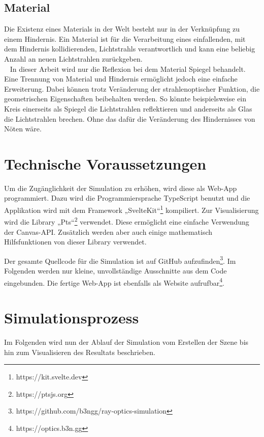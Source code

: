 \section{Material}
\label{material}
Die Existenz eines Materials  in der Welt besteht nur in der Verknüpfung zu einem Hindernis. 
Ein Material ist für die Verarbeitung eines einfallenden, mit dem Hindernis kollidierenden, Lichtstrahls verantwortlich 
und kann eine beliebig Anzahl an neuen Lichtstrahlen zurückgeben. \\ 
In dieser Arbeit wird nur die Reflexion bei dem Material Spiegel  behandelt. 
Eine Trennung von Material und Hindernis ermöglicht jedoch eine einfache Erweiterung.
Dabei können trotz Veränderung der strahlenoptischer Funktion, die geometrischen Eigenschaften beibehalten werden.
So könnte beispielsweise ein Kreis einerseits als Spiegel die Lichtstrahlen reflektieren 
und anderseits als Glas die Lichtstrahlen brechen. Ohne das dafür die Veränderung des Hindernisses von Nöten wäre.


\chapter{Technische Voraussetzungen}
Um die Zugänglichkeit der Simulation zu erhöhen, wird diese als Web-App programmiert. 
Dazu wird die Programmiersprache TypeScript benutzt und die Applikation wird mit dem Framework „SvelteKit“\footnote{https://kit.svelte.dev} kompiliert.
Zur Visualisierung wird die Library „Pts“\footnote{https://ptsjs.org} verwendet. Diese ermöglicht eine einfache Verwendung der Canvas-API. 
Zusätzlich werden aber auch einige mathematisch Hilfsfunktionen von dieser Library verwendet.

Der gesamte Quellcode für die Simulation ist auf GitHub aufzufinden\footnote{https://github.com/b3ngg/ray-optics-simulation}. 
Im Folgenden werden nur kleine, unvollständige Ausschnitte aus dem Code eingebunden. 
Die fertige Web-App ist ebenfalls als Website aufrufbar\footnote{https://optics.b3n.gg}.


\chapter{Simulationsprozess}
Im Folgenden wird nun der Ablauf der Simulation vom Erstellen der Szene bis hin zum Visualisieren des Resultats beschrieben.

